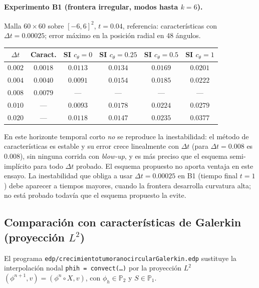 \paragraph{Experimento B1 (frontera irregular, modos hasta $k=6$).} Malla $60\times60$ sobre $[-6,6]^2$, $t=0.04$, referencia: características con $\Delta t=0.00025$; error máximo en la posición radial en 48 ángulos.

\begin{center}
\begin{tabular}{c|c|cccc}
\toprule
$\Delta t$ & Caract. & SI $c_\theta=0$ & SI $c_\theta=0.25$ & SI $c_\theta=0.5$ & SI $c_\theta=1$\\
\midrule
$0.002$ & $0.0018$ & $0.0113$ & $0.0134$ & $0.0169$ & $0.0201$\\
$0.004$ & $0.0040$ & $0.0091$ & $0.0154$ & $0.0185$ & $0.0222$\\
$0.008$ & $0.0079$ & --- & --- & --- & ---\\
$0.010$ & --- & $0.0093$ & $0.0178$ & $0.0224$ & $0.0279$\\
$0.020$ & --- & $0.0118$ & $0.0147$ & $0.0235$ & $0.0377$\\
\bottomrule
\end{tabular}
\end{center}

En este horizonte temporal corto \emph{no} se reproduce la inestabilidad: el método de características es estable y su error crece linealmente con $\Delta t$ (para $\Delta t=0.008$ es $0.008$), sin ninguna corrida con \emph{blow-up}, y es más preciso que el esquema semi-implícito para todo $\Delta t$ probado. El esquema propuesto no aporta ventaja en este ensayo. La inestabilidad que obliga a usar $\Delta t=0.00025$ en B1 (tiempo final $t=1$) debe aparecer a tiempos mayores, cuando la frontera desarrolla curvatura alta; no está probado todavía que el esquema propuesto la evite.

\subsection{Comparación con características de Galerkin (proyección $L^2$)}

El programa \texttt{edp/crecimientotumoranocircularGalerkin.edp} sustituye la interpolación nodal \texttt{phih = convect(\dots)} por la proyección $L^2$ $(\phi^{n+1},v)=(\phi^n\circ X,v)$, con $\phi_h\in\mathbb{P}_2$ y $S\in\mathbb{P}_1$.

